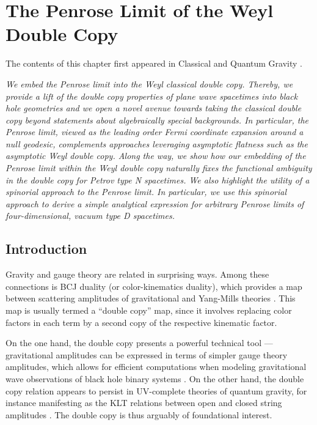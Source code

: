 \chapter{The Penrose Limit of the Weyl Double Copy} \label{chap:Penrose}

The contents of this chapter first appeared in Classical and Quantum Gravity \cite{Chawla:2024mse}.

\textit{We embed the Penrose limit into the Weyl classical double copy. Thereby,
we provide a lift of the double copy properties of plane wave spacetimes into black
hole geometries and we open a novel avenue towards taking the classical double copy
beyond statements about algebraically special backgrounds. In particular, the Penrose
limit, viewed as the leading order Fermi coordinate expansion around a null geodesic,
complements approaches leveraging asymptotic flatness such as the asymptotic Weyl
double copy. Along the way, we show how our embedding of the Penrose limit within
the Weyl double copy naturally fixes the functional ambiguity in the double copy for
Petrov type N spacetimes. We also highlight the utility of a spinorial approach to the
Penrose limit. In particular, we use this spinorial approach to derive a simple analytical
expression for arbitrary Penrose limits of four-dimensional, vacuum type D spacetimes.}

\section{Introduction}
Gravity and gauge theory are related in surprising ways. Among these connections is BCJ duality (or
color-kinematics duality), which provides a map between scattering amplitudes of gravitational and Yang-Mills
theories \cite{Bern:2019prr,Bern:2022wqg,Adamo:2022dcm}. This map is usually termed a ``double copy'' map, since it
involves replacing color factors in each term by a second copy of the respective kinematic factor.

On the one hand, the double copy presents a powerful technical tool --- gravitational amplitudes can be expressed
in terms of simpler gauge theory amplitudes, which allows for efficient computations when modeling gravitational
wave observations of black hole binary systems
\cite{Bern:2019nnu,Bern:2019crd,Bern:2020uwk,Bern:2021yeh,Bern:2022jvn}. On the other hand, the double copy
relation appears to persist in UV-complete theories of quantum gravity, for instance manifesting as the KLT
relations between open and closed string amplitudes \cite{Kawai:1985xq}. The double copy is thus arguably of
foundational interest.

